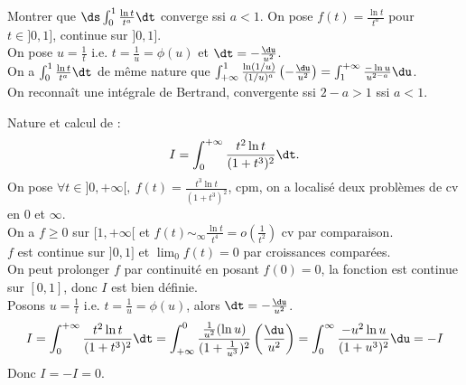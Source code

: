 \documentclass[11pt]{article}
\begin{document}
\begin{exercice}{}{}
    Montrer que $\ds\int_0^1\frac{\ln t}{t^a}\dt$ converge ssi $a<1$.
    \tcblower
    On pose $f(t)=\frac{\ln t}{t^a}$ pour $t\in]0,1]$, continue sur $]0,1]$.\\
    On pose $u=\frac{1}{t}$ i.e. $t=\frac{1}{u}=\phi(u)$ et $\dt=-\frac{\du}{u^2}$.\\
    On a $\int_0^1\frac{\ln t}{t^a}\dt$ de même nature que $\int_{+\infty}^1\frac{\ln(1/u)}{(1/u)^a}\left( -\frac{\du}{u^2} \right)=\int_1^{+\infty}\frac{-\ln u}{u^{2-a}}\du$.\\
    On reconnaît une intégrale de Bertrand, convergente ssi $2-a>1$ ssi $a<1$. 
\end{exercice}

\begin{exercice}{}{}
    Nature et calcul de :
    \begin{equation*}
        I=\int_0^{+\infty}\frac{t^2\ln t}{(1+t^3)^2}\dt.
    \end{equation*}
    \tcblower
    On pose $\forall t \in ]0,+\infty[, ~ f(t)=\frac{t^3\ln t}{(1+t^3)^2}$, cpm, on a localisé deux problèmes de cv en 0 et $\infty$.\\
    \boxed{\infty} On a $f\geq0$ sur $[1,+\infty[$ et $f(t)\sim_{\infty}\frac{\ln t}{t^4}=o(\frac{1}{t^2})$ cv par comparaison.\\
     $f$ est continue sur $]0,1]$ et $\lim_0 f(t) = 0$ par croissances comparées.\\
    On peut prolonger $f$ par continuité en posant $f(0)=0$, la fonction est continue sur $[0,1]$, donc $I$ est bien définie.\\
    Posons $u=\frac{1}{t}$ i.e. $t=\frac{1}{u}=\phi(u)$, alors $\dt=-\frac{\du}{u^2}$.
    \begin{equation*}
        I=\int_0^{+\infty}\frac{t^2\ln t}{(1+t^3)^2}\dt = \int_{+\infty}^{0}\frac{\frac{1}{u^2}(\ln u)}{(1+\frac{1}{u^3})^2}\left( \frac{\du}{u^2} \right) = \int_0^\infty\frac{-u^2\ln u}{(1+u^3)^2}\du=-I
    \end{equation*}
    Donc $I=-I=0$.
\end{exercice}
\end{document}
